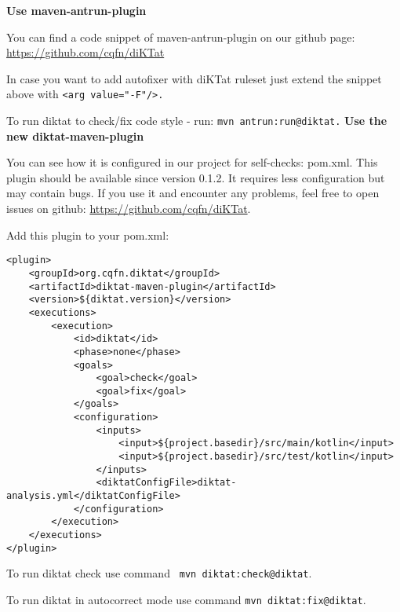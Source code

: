 \textbf{Use maven-antrun-plugin}
\par You can find a code snippet of maven-antrun-plugin on our github page: \url{https://github.com/cqfn/diKTat}
\par In case you want to add autofixer with diKTat ruleset just extend the snippet above with \verb|<arg value="-F"/>.|

\par To run diktat to check/fix code style - run: \verb|mvn antrun:run@diktat.|
\newline
\textbf{Use the new diktat-maven-plugin}
\par You can see how it is configured in our project for self-checks: pom.xml. This plugin should be available since version 0.1.2. It requires less configuration but may contain bugs. If you use it and encounter any problems, feel free to open issues on github: \url{https://github.com/cqfn/diKTat}.

Add this plugin to your pom.xml:
\begin{verbatim}
<plugin>
    <groupId>org.cqfn.diktat</groupId>
    <artifactId>diktat-maven-plugin</artifactId>
    <version>${diktat.version}</version>
    <executions>
        <execution>
            <id>diktat</id>
            <phase>none</phase>
            <goals>
                <goal>check</goal>
                <goal>fix</goal>
            </goals>
            <configuration>
                <inputs>
                    <input>${project.basedir}/src/main/kotlin</input>
                    <input>${project.basedir}/src/test/kotlin</input>
                </inputs>
                <diktatConfigFile>diktat-analysis.yml</diktatConfigFile>
            </configuration>
        </execution>
    </executions>
</plugin>
\end{verbatim}

\par To run diktat check use command \verb| mvn diktat:check@diktat|.
\par To run diktat in autocorrect mode use command \verb|mvn diktat:fix@diktat|.